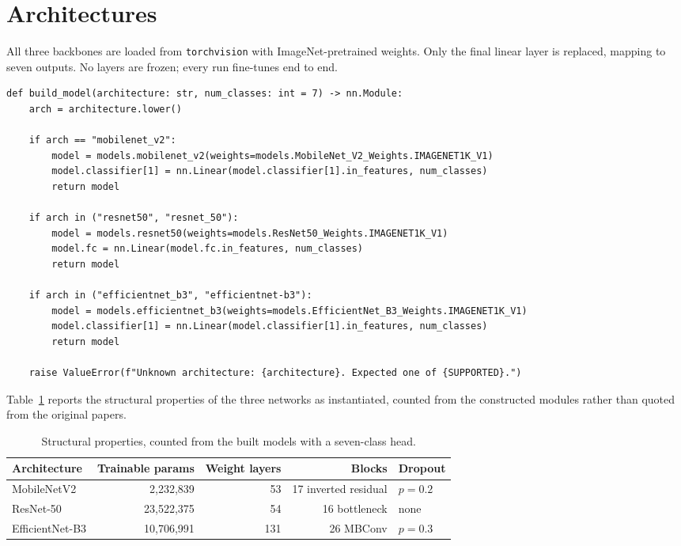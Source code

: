 \section{Architectures}
\label{sec:method-arch}

All three backbones are loaded from \texttt{torchvision} with ImageNet-pretrained
weights. Only the final linear layer is replaced, mapping to seven outputs. No layers are
frozen; every run fine-tunes end to end.

\begin{lstlisting}[caption={Backbone construction, \texttt{src/ham10000/models.py}. For
MobileNetV2 and EfficientNet-B3 the classifier is a \texttt{Sequential(Dropout, Linear)},
so replacing index 1 leaves the dropout at index 0 in place.},
                   label={lst:models}]
def build_model(architecture: str, num_classes: int = 7) -> nn.Module:
    arch = architecture.lower()

    if arch == "mobilenet_v2":
        model = models.mobilenet_v2(weights=models.MobileNet_V2_Weights.IMAGENET1K_V1)
        model.classifier[1] = nn.Linear(model.classifier[1].in_features, num_classes)
        return model

    if arch in ("resnet50", "resnet_50"):
        model = models.resnet50(weights=models.ResNet50_Weights.IMAGENET1K_V1)
        model.fc = nn.Linear(model.fc.in_features, num_classes)
        return model

    if arch in ("efficientnet_b3", "efficientnet-b3"):
        model = models.efficientnet_b3(weights=models.EfficientNet_B3_Weights.IMAGENET1K_V1)
        model.classifier[1] = nn.Linear(model.classifier[1].in_features, num_classes)
        return model

    raise ValueError(f"Unknown architecture: {architecture}. Expected one of {SUPPORTED}.")
\end{lstlisting}

Table~\ref{tab:arch-structure} reports the structural properties of the three networks
as instantiated, counted from the constructed modules rather than quoted from the
original papers.

\begin{table}[htbp]
\centering
\caption{Structural properties, counted from the built models with a seven-class head.}
\label{tab:arch-structure}
\small
\begin{tabular}{@{}lrrrl@{}}
\toprule
\textbf{Architecture} & \textbf{Trainable params} & \textbf{Weight layers} &
\textbf{Blocks} & \textbf{Dropout} \\
\midrule
MobileNetV2     &  2{,}232{,}839 &  53 & 17 inverted residual & $p = 0.2$ \\
ResNet-50       & 23{,}522{,}375 &  54 & 16 bottleneck        & none \\
EfficientNet-B3 & 10{,}706{,}991 & 131 & 26 MBConv            & $p = 0.3$ \\
\bottomrule
\end{tabular}
\end{table}

